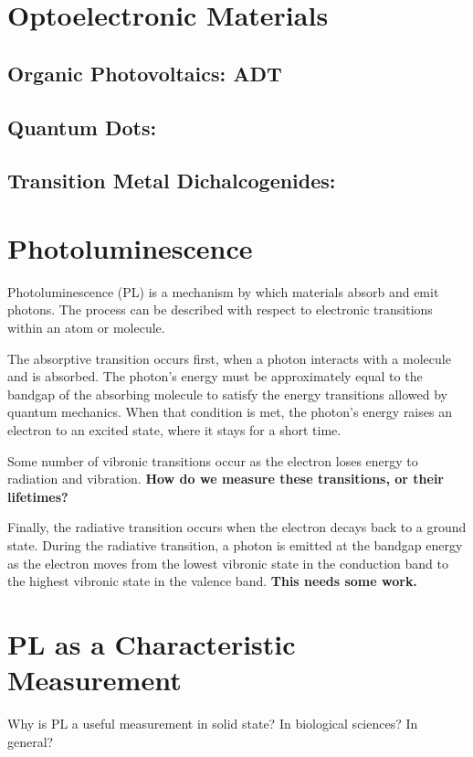 \section{Optoelectronic Materials}
\subsection{Organic Photovoltaics: ADT}
\subsection{Quantum Dots: }
\subsection{Transition Metal Dichalcogenides: }

\section{Photoluminescence}
Photoluminescence (PL) is a mechanism by which materials absorb and emit photons. The process can be described with respect to electronic transitions within an atom or molecule.

The absorptive transition occurs first, when a photon interacts with a molecule and is absorbed. The photon's energy must be approximately equal to the bandgap of the absorbing molecule to satisfy the energy transitions allowed by quantum mechanics. When that condition is met, the photon's energy raises an electron to an excited state, where it stays for a short time.

Some number of vibronic transitions occur as the electron loses energy to radiation and vibration. \textbf{How do we measure these transitions, or their lifetimes?}

Finally, the radiative transition occurs when the electron decays back to a ground state. During the radiative transition, a photon is emitted at the bandgap energy as the electron moves from the lowest vibronic state in the conduction band to the highest vibronic state in the valence band. \textbf{This needs some work.}

\section{PL as a Characteristic Measurement}
Why is PL a useful measurement in solid state? In biological sciences? In general?
